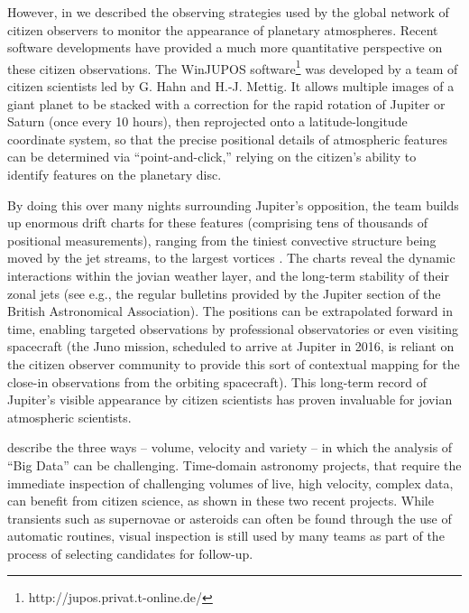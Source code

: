 \documentclass{ar2e}
\begin{document}
However, in  we described the observing strategies used by
the global network of citizen observers to monitor the appearance of planetary
atmospheres.  Recent software developments have provided a much more
quantitative perspective on these citizen observations. The WinJUPOS
software\footnote{http://jupos.privat.t-online.de/} was developed by a team of
citizen scientists led by G. Hahn and H.-J. Mettig. It allows multiple images of
a giant planet to be stacked with a correction for the rapid rotation of Jupiter
or Saturn  (once every 10 hours), then reprojected onto a latitude-longitude
coordinate system, so that the precise positional details of atmospheric
features can be determined via ``point-and-click,'' relying on the citizen's
ability to identify features on the planetary disc.  

By doing this over many nights surrounding Jupiter's opposition, the team
builds up enormous drift charts for these features (comprising tens of
thousands of positional measurements), ranging from the tiniest convective
structure being moved by the jet streams, to the largest vortices
\citep[e.g.][]{WinJUPOSRedSpot}.  The charts reveal the dynamic interactions
within the jovian weather layer, and the long-term stability of their zonal
jets (see e.g., the regular bulletins provided by the Jupiter section of the
British Astronomical Association). The positions can be extrapolated forward
in time, enabling targeted observations by professional observatories or even
visiting spacecraft (the Juno mission, scheduled to arrive at Jupiter in 2016,
is reliant on the citizen observer community to provide this sort of
contextual mapping for the close-in observations from the orbiting
spacecraft).  This long-term record of Jupiter's visible appearance by citizen
scientists has proven invaluable for jovian atmospheric scientists.



  \label{SNZoo} 
\citet{threeVs} describe the three ways -- volume, velocity and variety -- in
which the analysis of ``Big Data'' can be challenging. Time-domain astronomy
projects, that require the immediate inspection of challenging volumes of live,
high velocity, complex data, can benefit from citizen science, as shown in these
two recent projects.  While transients such as supernovae or asteroids can often
be found through the use of automatic routines, visual inspection is still used
by many teams as part of the process of selecting candidates for follow-up. 
\end{document}

